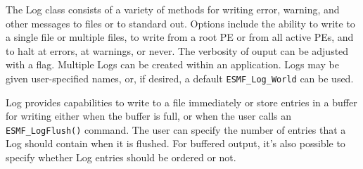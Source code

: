 %


The Log class consists of a variety of methods for writing error, warning, 
and other messages to files or to standard out.  Options include the ability 
to write to a single file or multiple files, to write from a root PE or 
from all active PEs, and to halt at errors, at warnings, or never.  The 
verbosity of ouput can be adjusted with a flag.  Multiple 
Logs can be created within an application.  Logs may be given
user-specified names, or, if desired, a default {\tt ESMF\_Log\_World} can 
be used.  

Log provides capabilities to write to a file immediately or store entries 
in a buffer for writing either when the buffer is full, or when the user
calls an {\tt ESMF_LogFlush()} command.  The user can specify the number 
of entries that a Log should contain when it is flushed.  For buffered output, 
it's also possible to specify whether Log entries should be ordered or not.  

